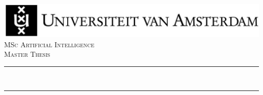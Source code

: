 
\newcommand{\red}[1]{{\color{red}{#1}}}




\begin{titlepage}

\newcommand{\HRule}{\rule{\linewidth}{0.5mm}} %
\center %
 

\includegraphics[width=\linewidth]{figures/uva.jpg}\\[2.5cm]
\textsc{\Large MSc Artificial Intelligence}\\[0.2cm]
\textsc{\Large Master Thesis}\\[0.5cm] 


\HRule \\[0.4cm]
{ \huge \bfseries \red{
    Type-driven Programming-by-Example \\
}}%
\HRule \\[0.5cm]
 


\end{titlepage}
